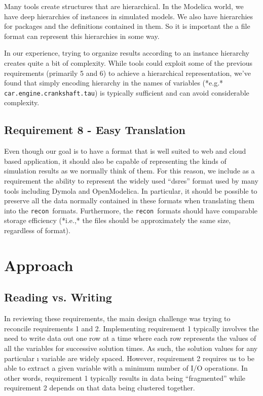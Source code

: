 \documentclass[11pt,a4paper,onecolumn]{article}
\newcommand{\recon}{\texttt{recon}}
\newcommand{\code}[1]{\texttt{#1}} %
\begin{document}

Many tools create structures that are hierarchical.  In the Modelica
world, we have deep hierarchies of instances in simulated models.  We
also have hierarchies for packages and the definitions contained in
them.  So it is important the a file format can represent this
hierarchies in some way.

In our experience, trying to organize results according to an instance
hierarchy creates quite a bit of complexity.  While tools could
exploit some of the previous requirements (primarily 5 and 6) to
achieve a hierarchical representation, we've found that simply
encoding hierarchy in the names of variables (*e.g.*
\code{car.engine.crankshaft.tau}) is typically sufficient and can
avoid considerable complexity.

\subsection{Requirement 8 - Easy Translation}


Even though our goal is to have a format that is well suited to web
and cloud based application, it should also be capable of representing
the kinds of simulation results as we normally think of them.  For
this reason, we include as a requirement the ability to represent the
widely used ``dsres'' format used by many tools including Dymola and
OpenModelica.  In particular, it should be possible to preserve all
the data normally contained in these formats when translating them
into the \recon\ formats.  Furthermore, the \recon\ formats should have
comparable storage efficiency (*i.e.,* the files should be
approximately the same size, regardless of format).

\section{Approach}

\subsection{Reading vs. Writing}

In reviewing these requirements, the main design challenge was trying
to reconcile requirements 1 and 2.  Implementing requirement 1
typically involves the need to write data out one row at a time where
each row represents the values of all the variables for successive
solution times.  As such, the solution values for any particular {\i
  variable} are widely spaced.  However, requirement 2 requires us to
be able to extract a given variable with a minimum number of I/O
operations.  In other words, requirement 1 typically results in data
being ``fragmented'' while requirement 2 depends on that data being
clustered together.
\end{document}
